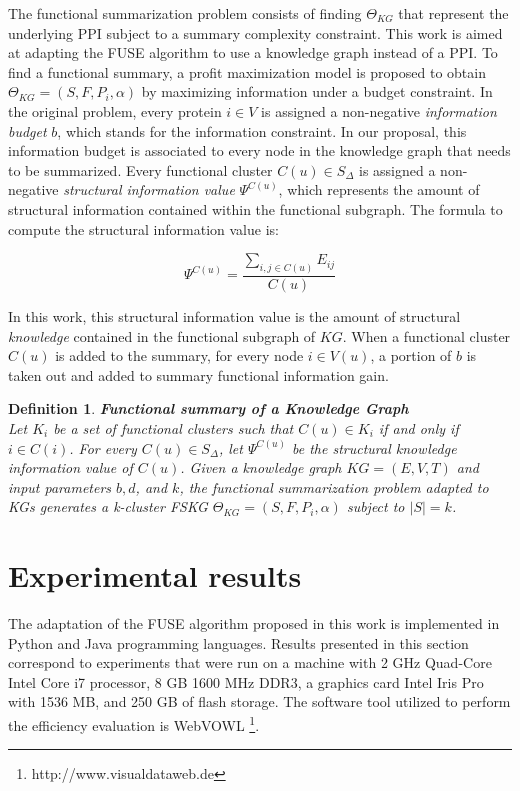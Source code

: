 \documentclass{ieeeaccess}
\newtheorem{Definition}{Definition}
\begin{document}
The functional summarization problem consists of finding $\Theta_{KG}$
that represent the underlying PPI subject to a summary complexity constraint.
This work is aimed at adapting the FUSE algorithm to use a knowledge graph instead of
a PPI. To find a functional summary, a profit maximization model is proposed to
obtain $\Theta_{KG} = (S, F, P_{i}, \alpha)$ by maximizing information under a
budget constraint. In the original problem, every protein $i \in V$ is assigned
a non-negative \textit{information budget} $b$, which stands for the information
constraint. In our proposal, this information budget is associated to every node in
the knowledge graph that needs to be summarized. Every functional cluster $C(u) \in S_{\Delta}$
is assigned a non-negative \textit{structural information value} $\Psi^{C(u)}$, which
represents the amount of structural information contained within the functional
subgraph. The formula to compute the structural information value is:

\begin{equation}
\label{eqn_coverage}
\Psi^{C(u)} = \frac{\sum_{i,j \in C(u)} E_{ij}}{C(u)}
\end{equation}

In this work, this structural information value is the amount of structural
\textit{knowledge} contained in the functional subgraph of $KG$. When a functional
cluster $C(u)$ is added to the summary, for every node $i \in V(u)$, a portion of $b$ 
is taken out and added to summary functional information gain.

\begin{Definition}
\textbf{Functional summary of a Knowledge Graph} \\
Let $K_{i}$ be a set of functional clusters such that $C(u) \in K_{i}$ if and only if
$i \in C(i)$. For every $C(u) \in S_{\Delta}$, let $\Psi^{C(u)}$ be the structural knowledge
information value of $C(u)$. Given a knowledge graph $KG = (E,V,T)$ and input parameters
$b, d$, and $k$, the \textit{functional summarization problem adapted to KGs} generates a
\textit{k-cluster} FSKG $\Theta_{KG} = (S, F, P_{i}, \alpha)$ subject to $\vert S \vert = k$.

\end{Definition}

\section{Experimental results}
\label{sec:results}
The adaptation of the FUSE algorithm proposed in this work is implemented in Python and Java
programming languages. Results presented in this section correspond to experiments that were run on 
a machine with 2 GHz Quad-Core Intel Core i7 processor, 8 GB 1600 MHz DDR3, a graphics
card Intel Iris Pro with 1536 MB, and 250 GB of flash storage. The software tool utilized to
perform the efficiency evaluation is WebVOWL \footnote{http://www.visualdataweb.de}.
\end{document}
